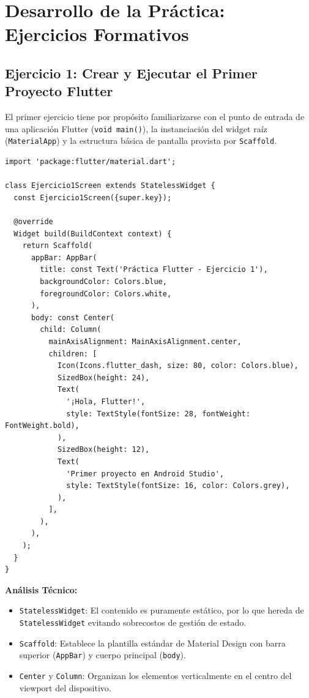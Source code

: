 \documentclass[12pt,a4paper]{article}
\begin{document}
\section{Desarrollo de la Práctica: Ejercicios Formativos}

\subsection{Ejercicio 1: Crear y Ejecutar el Primer Proyecto Flutter}
El primer ejercicio tiene por propósito familiarizarse con el punto de entrada de una aplicación Flutter (\texttt{void main()}), la instanciación del widget raíz (\texttt{MaterialApp}) y la estructura básica de pantalla provista por \texttt{Scaffold}.

\begin{lstlisting}[caption={Código fuente de PantallaInicio en Ejercicio 1 (lib/screens/ejercicio1\_screen.dart)}]
import 'package:flutter/material.dart';

class Ejercicio1Screen extends StatelessWidget {
  const Ejercicio1Screen({super.key});

  @override
  Widget build(BuildContext context) {
    return Scaffold(
      appBar: AppBar(
        title: const Text('Práctica Flutter - Ejercicio 1'),
        backgroundColor: Colors.blue,
        foregroundColor: Colors.white,
      ),
      body: const Center(
        child: Column(
          mainAxisAlignment: MainAxisAlignment.center,
          children: [
            Icon(Icons.flutter_dash, size: 80, color: Colors.blue),
            SizedBox(height: 24),
            Text(
              '¡Hola, Flutter!',
              style: TextStyle(fontSize: 28, fontWeight: FontWeight.bold),
            ),
            SizedBox(height: 12),
            Text(
              'Primer proyecto en Android Studio',
              style: TextStyle(fontSize: 16, color: Colors.grey),
            ),
          ],
        ),
      ),
    );
  }
}
\end{lstlisting}

\textbf{Análisis Técnico:}
\begin{itemize}[noitemsep]
    \item \texttt{StatelessWidget}: El contenido es puramente estático, por lo que hereda de \texttt{StatelessWidget} evitando sobrecostos de gestión de estado.
    \item \texttt{Scaffold}: Establece la plantilla estándar de Material Design con barra superior (\texttt{AppBar}) y cuerpo principal (\texttt{body}).
    \item \texttt{Center} y \texttt{Column}: Organizan los elementos verticalmente en el centro del viewport del dispositivo.
\end{itemize}
\end{document}
